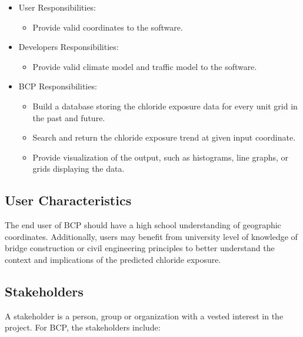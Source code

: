 \documentclass[12pt]{article}
\begin{document}
\begin{itemize}
\item User Responsibilities:
\begin{itemize}
\item Provide valid coordinates to the software.
\end{itemize}

\item Developers Responsibilities:
\begin{itemize}
\item Provide valid climate model and traffic model to the software.
\end{itemize}

\item BCP Responsibilities:
\begin{itemize}
\item Build a database storing the chloride exposure data for every unit grid in the past and future.
\item Search and return the chloride exposure trend at given input coordinate.
\item Provide visualization of the output, such as histograms, line graphs, or grids displaying the data.
\end{itemize}
\end{itemize}

\subsection{User Characteristics} \label{SecUserCharacteristics}
The end user of BCP should have a high school understanding of geographic coordinates. Additionally, users may benefit from university level of knowledge of bridge construction or civil engineering principles to better understand the context and implications of the predicted chloride exposure.

\subsection{Stakeholders} \label{Stakeholders}
 A stakeholder is a person, group or organization with a vested interest in the project. For BCP, the stakeholders include:
\end{document}
